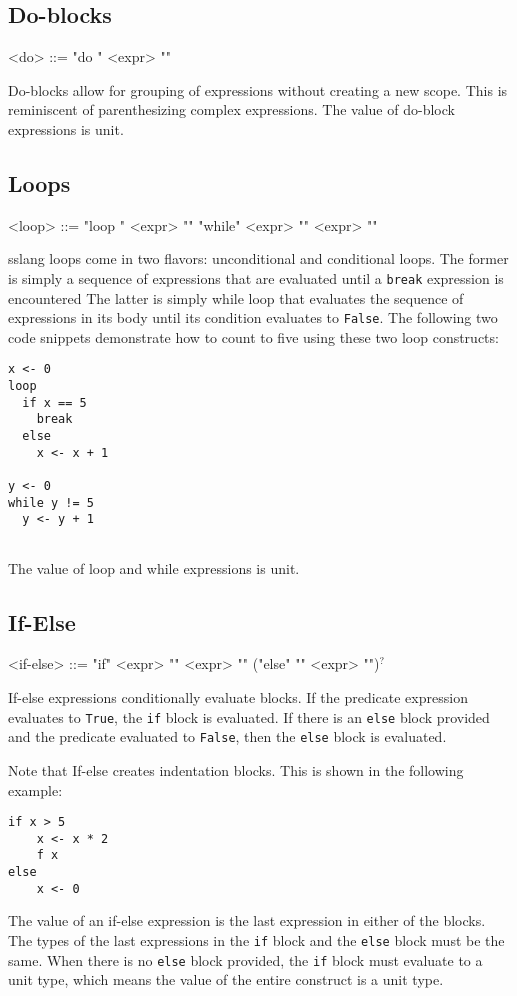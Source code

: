 \documentclass{article}
\begin{document}
\subsection{Do-blocks}
\begin{grammar}
<do> ::= "do {" <expr> "}"
\end{grammar}
Do-blocks allow for grouping of expressions without creating a new scope. This is reminiscent of parenthesizing complex expressions.
The value of do-block expressions is unit.
\subsection{Loops}
\begin{grammar}
<loop> ::= "loop {" <expr> "}"
\alt "while" <expr> "{" <expr> "}"
\end{grammar}
sslang loops come in two flavors: unconditional and conditional loops. The former is simply a sequence of expressions that are evaluated until a \texttt{break} expression is encountered The latter is simply while loop that evaluates the sequence of expressions in its body until its condition evaluates to \texttt{False}. The following two code snippets demonstrate how to count to five using these two loop constructs:
\begin{lstlisting}
x <- 0
loop
  if x == 5
    break
  else 
    x <- x + 1
    
y <- 0
while y != 5
  y <- y + 1
 
\end{lstlisting}
The value of loop and while expressions is unit.
\subsection{If-Else}
\begin{grammar}
<if-else> ::= "if" <expr> "{" <expr> "}" ("else" "{" <expr> "}")$^{?}$
\end{grammar}
If-else expressions conditionally evaluate blocks. If the predicate expression evaluates to \texttt{True}, the \texttt{if} block is evaluated. If there is an \texttt{else} block provided and the predicate evaluated to \texttt{False}, then the \texttt{else} block is evaluated.

Note that If-else creates indentation blocks. This is shown in the following example:
\begin{lstlisting}
if x > 5
    x <- x * 2
    f x
else
    x <- 0
\end{lstlisting}

The value of an if-else expression is the last expression in either of the blocks. The types of the last expressions in the \texttt{if} block and the \texttt{else} block  must be the same. When there is no \texttt{else} block provided, the \texttt{if} block must evaluate to a unit type, which means the value of the entire construct is a unit type.
\end{document}
